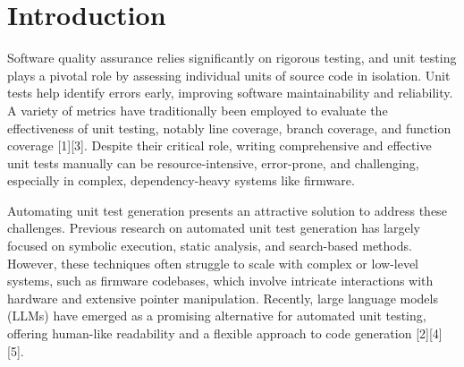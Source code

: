 \documentclass[conference]{IEEEtran}
\begin{document}
\begin{abstract}
The objective of this work is to create an automated unit testing solution for a codebase using LLMs (Large Language Models), LangChain, LangGraph, Python. A multi-agent system was created to automatically create unit tests for AMD’s openSIL (Advanced Micro Devices’ Open-Source Silicon Initialization Library) codebase. The codebase consisted of silicon initialization code and was built using the EDK II (Extensible Firmware Interface Development Kit) Build System. Performance is measured by line coverage of the unit test as the goal is to maximize line coverage. LLMs can be divided into two categories, reasoning and non-reasoning models. Previous works have explored unit testing capabilities of non-reasoning models. For this project, we focus specifically on utilizing reasoning models such as OpenAI o3 to create unit tests. In evaluation, the system compiled 73 out of 76 functions and reached an average line coverage of 84\%.  After adding LCA (Line-Coverage Analysis) and a line-coverage step that target missed lines, line coverage rose to 99\% on a second batch of 50 functions. By category, small and medium functions were the most consistent, while big and XFER/Ip2Ip ones required more time, effort, and edits. 
\end{abstract}

\section{Introduction}
Software quality assurance relies significantly on rigorous testing, and unit testing plays a pivotal role by assessing individual units of source code in isolation. Unit tests help identify errors early, improving software maintainability and reliability. A variety of metrics have traditionally been employed to evaluate the effectiveness of unit testing, notably line coverage, branch coverage, and function coverage [1][3]. Despite their critical role, writing comprehensive and effective unit tests manually can be resource-intensive, error-prone, and challenging, especially in complex, dependency-heavy systems like firmware. 

Automating unit test generation presents an attractive solution to address these challenges. Previous research on automated unit test generation has largely focused on symbolic execution, static analysis, and search-based methods. However, these techniques often struggle to scale with complex or low-level systems, such as firmware codebases, which involve intricate interactions with hardware and extensive pointer manipulation. Recently, large language models (LLMs) have emerged as a promising alternative for automated unit testing, offering human-like readability and a flexible approach to code generation [2][4][5]. 
\end{document}
